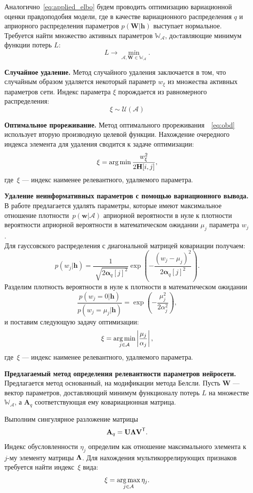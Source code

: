 Аналогично~\eqref{eq:applied_elbo} будем проводить оптимизацию вариационной оценки правдоподобия модели, где в качестве вариационного распределения $q$ и априорного распределения параметров $p(\mathbf{W}|\mathbf{h})$ выступает нормальное.
Требуется найти множество активных параметров $\mathbb{W}_{\mathcal{A}}$, доcтавляющие минимум функции потерь $L$:
$$
    L \to \min_{\mathcal{A}, \mathbf{W} \in \mathbb{W}_{\mathcal{A}}}.
$$


\textbf{Случайное удаление. }
Метод случайного удаления заключается в том, что случайным образом удаляется некоторый параметр $w_{\xi}$ из множества активных параметров сети.  Индекс параметра $\xi$ порождается из равномерного распределения:
$$\xi \sim \mathcal{U}(\mathcal{A})$$

\textbf{Оптимальное прореживание. }
Метод оптимального прореживания~\cite{obd}~\eqref{eq:obd} использует вторую производную целевой функции.
Нахождение очередного индекса элемента для удаления сводится к задаче оптимизации:
\[
    \xi = \operatorname*{arg\,min} \frac{w_{\xi}^2}{2\mathbf{H}[i,j]},
\]
где~$\xi$ --- индекс наименее релевантного, удаляемого параметра.

\textbf{Удаление неинформативных параметров с помощью вариационного вывода. }
В работе \cite{nips} предлагается удалять параметры, которые имеют максимальное отношение плотности~$p(\textbf{w}|\mathcal{A})$ априорной вероятности в нуле к плотности вероятности априорной вероятности в математическом ожидании $\mu_j$ параметра $w_j$.\\
Для гауссовского распределения с диагональной матрицей ковариации получаем:
$$p(w_j|\mathbf{h}) = \frac{1}{\sqrt[]{2\boldsymbol{\alpha}_q[j]^2}}\exp({-\frac{(w_j-\mu_j)^2}{2\boldsymbol{\alpha}_q[j]^2}}).$$
Разделим плотность вероятности в нуле к плотности в математическом ожидании
$$ \frac{p(w_j=0|\mathbf{h})}{p(w_j=\mu_j|\mathbf{h})}= \exp({-\frac{\mu_j^2}{2\alpha_j^2}}),$$
и поставим следующую задачу оптимизации:
$$\xi = \operatorname*{arg\,min}_{j\in \mathcal{A}} \left|\frac{\mu_j}{\alpha_j}\right|,$$
где~$\xi$ --- индекс наименее релевантного, удаляемого параметра.

\textbf{Предлагаемый метод определения релевантности параметров нейросети. }
Предлагается метод основанный, на модификации метода Белсли. Пусть $\mathbf{W}$ --- вектор параметров, доставляющий минимум функционалу потерь $L$ на  множестве $\mathbb{W_\mathcal{A}}$, а $\mathbf{A}_q$ соответствующая ему ковариационная матрица.

Выполним сингулярное разложение матрицы
$$\textbf{A}_q = \textbf{U}{\bf\Lambda}\textbf{V}^\mathsf{T}.$$
Индекс обусловленности $\eta_j$ определим как отношение максимального элемента к $j$-му элементу матрицы ${\bf\Lambda}$. Для нахождения мультикоррелирующих признаков требуется найти индекс~$\xi$ вида:
$$\xi = \operatorname*{arg\,max}_{j\in \mathcal{A}}{\eta_j}. $$

